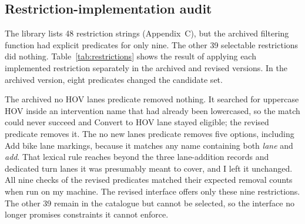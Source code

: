 \documentclass[11pt]{article}
\begin{document}
\subsection{Restriction-implementation audit}
\label{sec:restriction-audit}
The library lists 48 restriction strings (Appendix~C), but the archived filtering function had explicit predicates for only nine. The other 39 selectable restrictions did nothing. Table~\ref{tab:restrictions} shows the result of applying each implemented restriction separately in the archived and revised versions. In the archived version, eight predicates changed the candidate set.

The archived no HOV lanes predicate removed nothing. It searched for uppercase HOV inside an intervention name that had already been lowercased, so the match could never succeed and Convert to HOV lane stayed eligible; the revised predicate removes it. The no new lanes predicate removes five options, including Add bike lane markings, because it matches any name containing both \emph{lane} and \emph{add}. That lexical rule reaches beyond the three lane-addition records and dedicated turn lanes it was presumably meant to cover, and I left it unchanged. All nine checks of the revised predicates matched their expected removal counts when run on my machine. The revised interface offers only these nine restrictions. The other 39 remain in the catalogue but cannot be selected, so the interface no longer promises constraints it cannot enforce.
\end{document}
